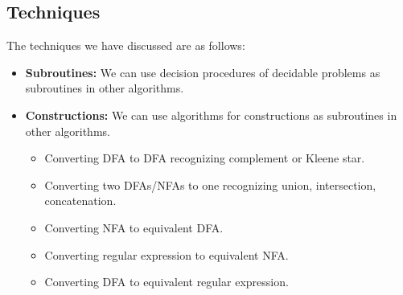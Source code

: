 \documentclass[letterpaper]{article}
\begin{document}
\subsection{Techniques}
The techniques we have discussed are as follows: 
\begin{itemize}
    \item \textbf{Subroutines:} We can use decision procedures of decidable problems as subroutines in other algorithms. 
    \item \textbf{Constructions:} We can use algorithms for constructions as subroutines in other algorithms.
    \begin{itemize}
        \item Converting DFA to DFA recognizing complement or Kleene star. 
        \item Converting two DFAs/NFAs to one recognizing union, intersection, concatenation. 
        \item Converting NFA to equivalent DFA. 
        \item Converting regular expression to equivalent NFA. 
        \item Converting DFA to equivalent regular expression.
    \end{itemize}
\end{itemize}
\end{document}
